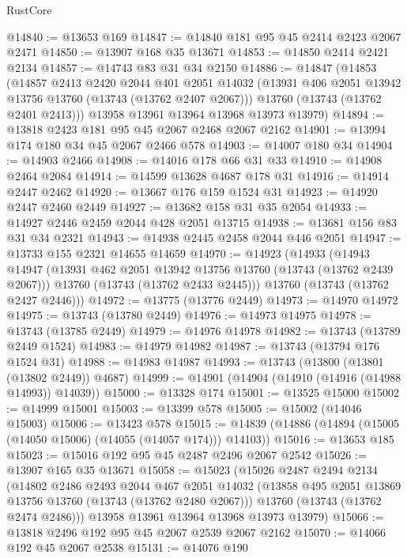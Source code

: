 \begin{lexlean}{RustCore}
\begin{coremodule}
@14840 := @13653 @169
@14847 := @14840 @181 @95 @45 @2414 @2423 @2067 @2471
@14850 := @13907 @168 @35 @13671
@14853 := @14850 @2414 @2421 @2134
@14857 := @14743 @83 @31 @34 @2150
@14886 := @14847
    (@14853
      (@14857
        @2413
        @2420
        @2044
        @401
        @2051
        @14032
        (@13931 @406 @2051 @13942 @13756 @13760 (@13743 (@13762 @2407 @2067)))
        @13760
        (@13743 (@13762 @2401 @2413)))
      @13958
      @13961
      @13964
      @13968
      @13973
      @13979)
@14894 := @13818 @2423 @181 @95 @45 @2067 @2468 @2067 @2162
@14901 := @13994 @174 @180 @34 @45 @2067 @2466 @578
@14903 := @14007 @180 @34
@14904 := @14903 @2466
@14908 := @14016 @178 @66 @31 @33
@14910 := @14908 @2464 @2084
@14914 := @14599 @13628 @4687 @178 @31
@14916 := @14914 @2447 @2462
@14920 := @13667 @176 @159 @1524 @31
@14923 := @14920 @2447 @2460 @2449
@14927 := @13682 @158 @31 @35 @2054
@14933 := @14927 @2446 @2459 @2044 @428 @2051 @13715
@14938 := @13681 @156 @83 @31 @34 @2321
@14943 := @14938 @2445 @2458 @2044 @446 @2051
@14947 := @13733 @155 @2321 @14655 @14659
@14970 := @14923
    (@14933
      (@14943
        @14947
        (@13931 @462 @2051 @13942 @13756 @13760 (@13743 (@13762 @2439 @2067)))
        @13760
        (@13743 (@13762 @2433 @2445)))
      @13760
      (@13743 (@13762 @2427 @2446)))
@14972 := @13775 (@13776 @2449)
@14973 := @14970 @14972
@14975 := @13743 (@13780 @2449)
@14976 := @14973 @14975
@14978 := @13743 (@13785 @2449)
@14979 := @14976 @14978
@14982 := @13743 (@13789 @2449 @1524)
@14983 := @14979 @14982
@14987 := @13743 (@13794 @176 @1524 @31)
@14988 := @14983 @14987
@14993 := @13743 (@13800 (@13801 (@13802 @2449)) @4687)
@14999 := @14901 (@14904 (@14910 (@14916 (@14988 @14993)) @14039))
@15000 := @13328 @174
@15001 := @13525 @15000
@15002 := @14999 @15001
@15003 := @13399 @578
@15005 := @15002 (@14046 @15003)
@15006 := @13423 @578
@15015 := @14839 (@14886 (@14894 (@15005 (@14050 @15006) (@14055 (@14057 @174))) @14103))
@15016 := @13653 @185
@15023 := @15016 @192 @95 @45 @2487 @2496 @2067 @2542
@15026 := @13907 @165 @35 @13671
@15058 := @15023
    (@15026
      @2487
      @2494
      @2134
      (@14802
        @2486
        @2493
        @2044
        @467
        @2051
        @14032
        (@13858 @495 @2051 @13869 @13756 @13760 (@13743 (@13762 @2480 @2067)))
        @13760
        (@13743 (@13762 @2474 @2486)))
      @13958
      @13961
      @13964
      @13968
      @13973
      @13979)
@15066 := @13818 @2496 @192 @95 @45 @2067 @2539 @2067 @2162
@15070 := @14066 @192 @45 @2067 @2538
@15131 := @14076
    @190

\end{coremodule}
\end{lexlean}
